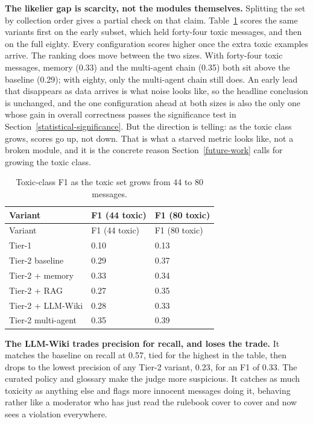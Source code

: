 \textbf{The likelier gap is scarcity, not the modules themselves.} Splitting the set by collection order gives a partial check on that claim. Table~\ref{tab:scaling-toxic} scores the same variants first on the early subset, which held forty-four toxic messages, and then on the full eighty. Every configuration scores higher once the extra toxic examples arrive. The ranking does move between the two sizes. With forty-four toxic messages, memory (0.33) and the multi-agent chain (0.35) both sit above the baseline (0.29); with eighty, only the multi-agent chain still does. An early lead that disappears as data arrives is what noise looks like, so the headline conclusion is unchanged, and the one configuration ahead at both sizes is also the only one whose gain in overall correctness passes the significance test in Section~\ref{statistical-significance}. But the direction is telling: as the toxic class grows, scores go up, not down. That is what a starved metric looks like, not a broken module, and it is the concrete reason Section~\ref{future-work} calls for growing the toxic class.

\begin{longtable}{@{}lll@{}}
\caption{Toxic-class F1 as the toxic set grows from 44 to 80 messages.}\label{tab:scaling-toxic}\tabularnewline
\toprule
Variant & F1 (44 toxic) & F1 (80 toxic) \\
\midrule
\endfirsthead
\toprule
Variant & F1 (44 toxic) & F1 (80 toxic) \\
\midrule
\endhead
\bottomrule
\endlastfoot
Tier-1 & 0.10 & 0.13 \\
Tier-2 baseline & 0.29 & 0.37 \\
Tier-2 + memory & 0.33 & 0.34 \\
Tier-2 + RAG & 0.27 & 0.35 \\
Tier-2 + LLM-Wiki & 0.28 & 0.33 \\
Tier-2 multi-agent & 0.35 & 0.39 \\
\end{longtable}

\textbf{The LLM-Wiki trades precision for recall, and loses the trade.} It matches the baseline on recall at 0.57, tied for the highest in the table, then drops to the lowest precision of any Tier-2 variant, 0.23, for an F1 of 0.33. The curated policy and glossary make the judge more suspicious. It catches as much toxicity as anything else and flags more innocent messages doing it, behaving rather like a moderator who has just read the rulebook cover to cover and now sees a violation everywhere.

